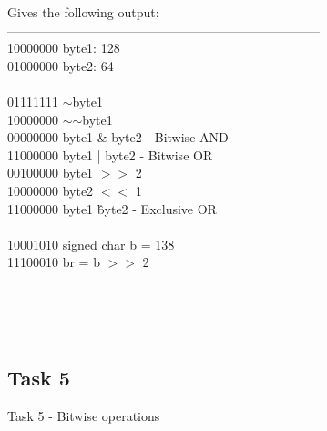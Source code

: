 \documentclass{report}
\begin{document}
				\begin{minipage}{\linewidth}
					Gives the following output: \\
					-------------------------------------------------------------------------- \\
					10000000\hspace{10mm}        byte1: 128 \\
					01000000\hspace{10mm}        byte2:  64 \\
					\\
					01111111\hspace{10mm}        $\sim$byte1 \\
					10000000\hspace{10mm}        $\sim$$\sim$byte1 \\
					00000000\hspace{10mm}        byte1 \& byte2	- Bitwise AND \\
					11000000\hspace{10mm}        byte1 | byte2	- Bitwise OR \\
					00100000\hspace{10mm}        byte1 $>>$ 2 \\
					10000000\hspace{10mm}        byte2 $<<$ 1 \\
					11000000\hspace{10mm}        byte1 \^byte2	- Exclusive OR \\
					\\
					10001010\hspace{10mm}        signed char b = 138 \\
					11100010\hspace{10mm}        br = b $>>$ 2 \\
					-------------------------------------------------------------------------- \\
				\end{minipage}
			\\ \\
			
			\subsection{Task 5}
			Task 5 - Bitwise operations \\
			
\end{document}

